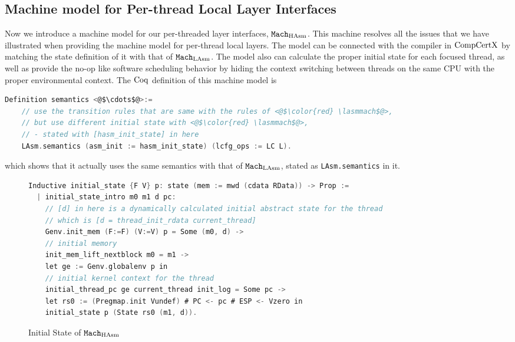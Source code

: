 \subsection{Machine model for Per-thread Local Layer Interfaces}
\label{chapter:linking:subsec:machine-model-for-single-threaded}

Now we introduce a machine model for our per-threaded layer interfaces, ${\mathrm{\texttt{Mach}}}_{\mathrm{HAsm}}$.
This machine resolves all the issues that we have illustrated when providing the machine model for per-thread local layers. 
The model can be connected with the compiler in $\mathrm{CompCertX}$ by matching the state definition of it with that of ${\mathrm{\texttt{Mach}}}_{\mathrm{LAsm}}$. 
The model also can calculate the proper initial state for each focused thread,
as well as provide the no-op like software scheduling behavior by hiding the context switching between threads on the same CPU with the proper environmental context. 
The $\mathrm{Coq}$ definition of this machine model is 
\begin{lstlisting}[language=C]
  Definition semantics <@$\cdots$@>:=
    // use the transition rules that are same with the rules of <@$\color{red} \lasmmach$@>,
    // but use different initial state with <@$\color{red} \lasmmach$@>,
    // - stated with [hasm_init_state] in here
    LAsm.semantics (asm_init := hasm_init_state) (lcfg_ops := LC L).
\end{lstlisting}
which shows that it actually uses the same semantics with that of  ${\mathrm{\texttt{Mach}}}_{\mathrm{LAsm}}$,  stated as \lstinline$LAsm.semantics$ in it.


\begin{figure}
\begin{lstlisting}[language=C]
Inductive initial_state {F V} p: state (mem := mwd (cdata RData)) -> Prop :=
  | initial_state_intro m0 m1 d pc:
    // [d] in here is a dynamically calculated initial abstract state for the thread
    // which is [d = thread_init_rdata current_thread]
    Genv.init_mem (F:=F) (V:=V) p = Some (m0, d) ->
    // initial memory 
    init_mem_lift_nextblock m0 = m1 ->
    let ge := Genv.globalenv p in
    // initial kernel context for the thread 
    initial_thread_pc ge current_thread init_log = Some pc ->
    let rs0 := (Pregmap.init Vundef) # PC <- pc # ESP <- Vzero in
    initial_state p (State rs0 (m1, d)).
\end{lstlisting}
\caption{Initial State of ${\mathrm{\texttt{Mach}}}_{\mathrm{HAsm}}$}
\label{fig:chapter:linking:initial-state-of-hasm}
\end{figure}


